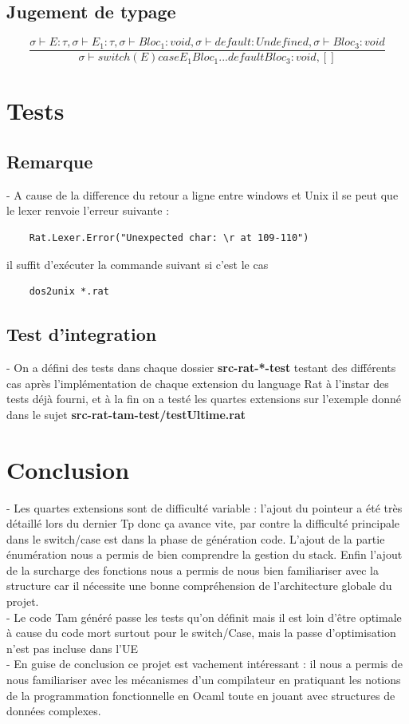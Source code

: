 \documentclass{article}
\begin{document}
\subsection{Jugement de typage}
\begin{equation}
    \frac{\sigma \vdash E : \tau, \sigma \vdash E_1 : \tau, \sigma \vdash Bloc_1: void, \sigma \vdash default : Undefined, \sigma \vdash Bloc_3 : void}
        {\sigma \vdash switch (E) case E_1 Bloc_1 ... default Bloc_3 : void,[]}
\end{equation}

\section{Tests}
\subsection{Remarque}
- A cause de la difference du retour a ligne entre windows et Unix il se peut que le lexer renvoie l'erreur suivante :
\begin{verbatim}
    Rat.Lexer.Error("Unexpected char: \r at 109-110")
\end{verbatim}
il suffit d'exécuter la commande suivant si c'est le cas 
\begin{verbatim}
    dos2unix *.rat
\end{verbatim}
\subsection{Test d'integration}
- On a défini des tests dans chaque dossier \textbf{src-rat-*-test} testant des différents cas après l'implémentation de chaque extension du language Rat à
l'instar des tests déjà fourni, et à la fin on a testé les quartes extensions sur l'exemple donné dans le sujet \textbf{src-rat-tam-test/testUltime.rat}
\section{Conclusion}
- Les quartes extensions sont de difficulté variable : l'ajout du pointeur a été très détaillé lors du dernier Tp donc ça avance vite,
 par contre la difficulté principale dans le switch/case est dans la phase de génération code. L'ajout de la partie énumération nous a permis de bien comprendre
la gestion du stack. Enfin l'ajout de la surcharge des fonctions nous a permis de nous bien familiariser 
avec la structure car il nécessite une bonne compréhension de l'architecture globale du projet. \\
- Le code Tam généré passe les tests qu'on définit mais il est loin d'être optimale à cause du code mort 
surtout pour le switch/Case, mais la passe d'optimisation n'est pas incluse dans l'UE  \\  
- En guise de conclusion ce projet est vachement intéressant : il nous a permis de nous familiariser avec les mécanismes d'un compilateur en pratiquant les notions de 
la programmation fonctionnelle en Ocaml toute en jouant avec structures de données complexes. \\
\end{document}
